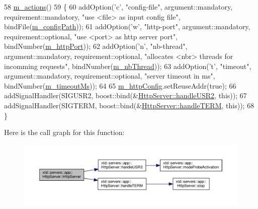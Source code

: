 \begin{DoxyCode}
58   \hyperlink{classxtd_1_1servers_1_1app_1_1HttpServer_afa5363da18a3aa9de651e53e409116e9}{m\_actions}()
59 \{
60   addOption(\textcolor{charliteral}{'c'}, \textcolor{stringliteral}{"config-file"}, argument::mandatory, requirement::mandatory, \textcolor{stringliteral}{"use <file> as input config
       file"},                bindFile(\hyperlink{classxtd_1_1servers_1_1app_1_1HttpServer_aa07526617267875dd907e29b99711ab6}{m\_configPath}));
61   addOption(\textcolor{charliteral}{'w'}, \textcolor{stringliteral}{"http-port"},   argument::mandatory, requirement::optional,  \textcolor{stringliteral}{"use <port> as http server
       port"},                 bindNumber(\hyperlink{classxtd_1_1servers_1_1app_1_1HttpServer_a75ed3bcfa895cad365f6bf0955efcf9e}{m\_httpPort}));
62   addOption(\textcolor{charliteral}{'n'}, \textcolor{stringliteral}{"nb-thread"},   argument::mandatory, requirement::optional,  \textcolor{stringliteral}{"allocates <nbr> threads for
       incomming requests"}, bindNumber(\hyperlink{classxtd_1_1servers_1_1app_1_1HttpServer_a2f0812d24ccfd55e943f3144c672b473}{m\_nbThread}));
63   addOption(\textcolor{charliteral}{'t'}, \textcolor{stringliteral}{"timeout"},     argument::mandatory, requirement::optional,  \textcolor{stringliteral}{"server timeout in ms"},       
                          bindNumber(\hyperlink{classxtd_1_1servers_1_1app_1_1HttpServer_adcaefcc003e9503dbe6ebea90bf70ef7}{m\_timeoutMs}));
64 
65   \hyperlink{classxtd_1_1servers_1_1app_1_1HttpServer_ad5f2480d758b731b641e4858f556a3c3}{m\_httpConfig}.setReuseAddr(\textcolor{keyword}{true});
66   addSignalHandler(SIGUSR2, boost::bind(&\hyperlink{classxtd_1_1servers_1_1app_1_1HttpServer_a6c6bb7c70218f171e327ed2197d0f6dc}{HttpServer::handleUSR2}, \textcolor{keyword}{this}));
67   addSignalHandler(SIGTERM, boost::bind(&\hyperlink{classxtd_1_1servers_1_1app_1_1HttpServer_a022eecad815296f1d27b19a4b6cca908}{HttpServer::handleTERM}, \textcolor{keyword}{this}));
68 \}
\end{DoxyCode}


Here is the call graph for this function\-:
\nopagebreak
\begin{figure}[H]
\begin{center}
\leavevmode
\includegraphics[width=350pt]{classxtd_1_1servers_1_1app_1_1HttpServer_a3ebbe8af998a3e3738e41a72375ffea9_cgraph}
\end{center}
\end{figure}


